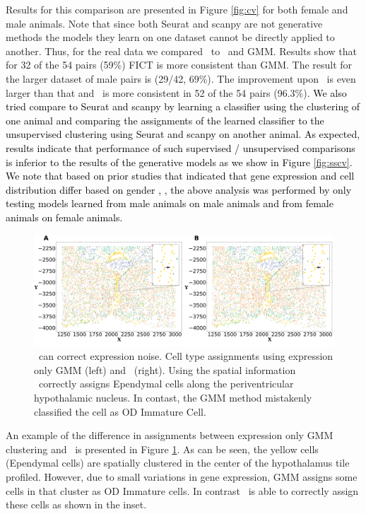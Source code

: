 Results for this comparison are presented in Figure \ref{fig:cv} for both female and male animals. Note that since both Seurat and scanpy are not generative methods the models they learn on one dataset cannot be directly applied to another. Thus, for the real data we compared \fict\ to \smfish\ and GMM. Results show that for 32 of the 54 pairs (59\%) FICT is more consistent than GMM. The result for the larger dataset of male pairs is (29/42, 69\%). The improvement upon \smfish\ is even larger than that and \fict\ is more consistent in 52 of the 54 pairs (96.3\%). \textcolor{black}{We also tried compare to Seurat and scanpy by learning a classifier using the clustering of one animal and comparing the assignments of the learned classifier to the unsupervised clustering using Seurat and scanpy on another animal. As expected, results indicate that performance of such supervised / unsupervised comparisons is inferior to the results of the generative models as we show in Figure \ref{fig:sscv}.} \textcolor{black}{We note that based on prior studies that indicated that gene expression and cell distribution differ based on gender   \cite{dewing2003sexually}, \cite{mccarthy2011reframing}, the above analysis was performed by only testing models learned from male animals on male animals and from female animals on female animals.}
\begin{figure}[hbt!]
    \includegraphics[width=\textwidth]{figs/Zoomed_In.png}
    \caption{\fict\ can correct expression noise. Cell type assignments using expression only GMM (left) and \fict\ (right). Using the spatial information \fict\ correctly assigns Ependymal cells along the periventricular hypothalamic nucleus. In contast, the GMM method mistakenly  classified the cell as OD Immature Cell.}
    \label{fig:Zoomin}
\end{figure}
An example of the difference in assignments between expression only GMM clustering and \fict\ is presented in Figure \ref{fig:Zoomin}. As can be seen, the yellow cells (Ependymal cells) are spatially clustered in the center of the hypothalamus tile profiled. However, due to small variations in gene expression, GMM assigns some cells in that cluster as OD Immature cells. In contrast \fict\ is able to correctly assign these cells as shown in the inset. 

